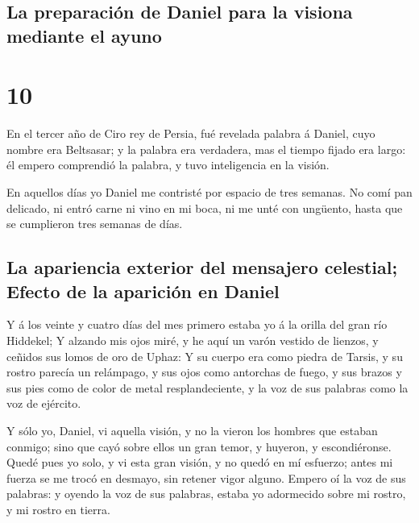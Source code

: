 \hypertarget{la-preparaciuxf3n-de-daniel-para-la-visiona-mediante-el-ayuno}{%
\subsection{La preparación de Daniel para la visiona mediante el
ayuno}\label{la-preparaciuxf3n-de-daniel-para-la-visiona-mediante-el-ayuno}}

\hypertarget{section-27-10}{%
\section{10}\label{section-27-10}}

 En el tercer año de Ciro rey de Persia, fué revelada
palabra á Daniel, cuyo nombre era Beltsasar; y la palabra era verdadera,
mas el tiempo fijado era largo: él empero comprendió la palabra, y tuvo
inteligencia en la visión.

 En aquellos días yo Daniel me contristé por espacio de
tres semanas.  No comí pan delicado, ni entró carne ni
vino en mi boca, ni me unté con ungüento, hasta que se cumplieron tres
semanas de días.

\hypertarget{la-apariencia-exterior-del-mensajero-celestial-efecto-de-la-apariciuxf3n-en-daniel}{%
\subsection{La apariencia exterior del mensajero celestial; Efecto de la
aparición en
Daniel}\label{la-apariencia-exterior-del-mensajero-celestial-efecto-de-la-apariciuxf3n-en-daniel}}

 Y á los veinte y cuatro días del mes primero estaba yo á
la orilla del gran río Hiddekel;  Y alzando mis ojos miré,
y he aquí un varón vestido de lienzos, y ceñidos sus lomos de oro de
Uphaz:  Y su cuerpo era como piedra de Tarsis, y su rostro
parecía un relámpago, y sus ojos como antorchas de fuego, y sus brazos y
sus pies como de color de metal resplandeciente, y la voz de sus
palabras como la voz de ejército.

 Y sólo yo, Daniel, vi aquella visión, y no la vieron los
hombres que estaban conmigo; sino que cayó sobre ellos un gran temor, y
huyeron, y escondiéronse.  Quedé pues yo solo, y vi esta
gran visión, y no quedó en mí esfuerzo; antes mi fuerza se me trocó en
desmayo, sin retener vigor alguno.  Empero oí la voz de
sus palabras: y oyendo la voz de sus palabras, estaba yo adormecido
sobre mi rostro, y mi rostro en tierra.

